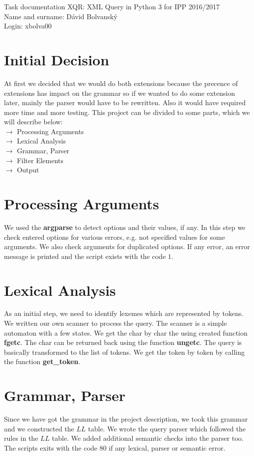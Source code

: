 \documentclass[10pt,a4paper]{article}
\author{Dávid Bolvanský}
\begin{document}
\noindent
Task documentation XQR: XML Query in Python 3 for IPP 2016/2017\\
Name and surname: Dávid Bolvanský\\
Login: xbolva00

\section{Initial Decision}
	At first we decided that we would do both extensions because the precence of extensions has impact on the grammar so if we wanted to do some extension later, mainly the parser would have to be rewritten. Also it would have required more time and more testing. This project can be divided to some parts, which we will describe below:\\
	$\rightarrow$ Processing Arguments\\ 
	$\rightarrow$ Lexical Analysis\\ 
	$\rightarrow$ Grammar, Parser\\ 
	$\rightarrow$ Filter Elements\\
	$\rightarrow$ Output
	
	
\section{Processing Arguments}
	We used the \textbf{argparse} to detect options and their values, if any. In this step we check entered options for various errors, e.g. not specified values for some arguments.  We also check arguments for duplicated options. If any error, an error message is printed and the script exists with the code $1$. 
	
\section{Lexical Analysis}
	As an initial step, we need to identify lexemes which are represented by tokens. We written our own scanner to process the query. The scanner is a simple automaton with a few states. We get the char by char the using created function \textbf{fgetc}. The char can be returned back using the function \textbf{ungetc}. The query is basically transformed to the list of tokens. We get the token by token by calling the function \textbf{get\_token}. 
	
\section{Grammar, Parser}
	Since we have got the grammar in the project description, we took this grammar and we constructed the $LL$ table. We wrote the query parser which followed the rules in the $LL$ table. We added additional semantic checks into the parser too. The scripts exits with the code $80$ if any lexical, parser or semantic error.
	
\end{document}
